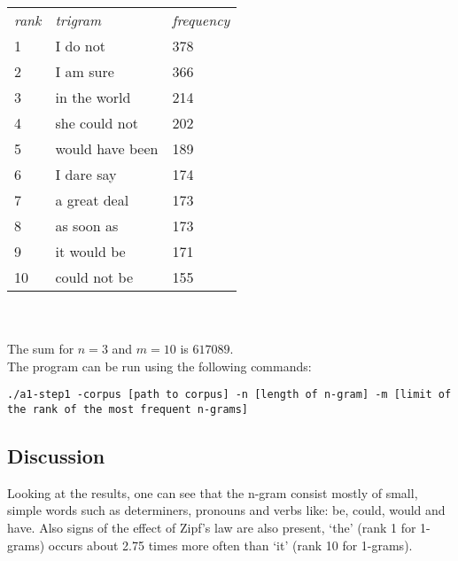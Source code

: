 \documentclass[a4paper, 10pt]{article}
\begin{document}
\begin{tabular}{l l l}
\textit{rank}&	\textit{trigram}	& \textit{frequency} \\
1	&	I do not		&	 378 \\
2	&	I am sure		&	 366 \\
3	&	in the world	&	 214 \\
4	&	she could not	&	 202 \\
5	&	would have been	&	 189 \\
6	&	I dare say		&	 174 \\
7	&	a great deal	&	 173 \\
8	&	as soon as		&	 173 \\
9	&	it would be		&	 171 \\
10	&	could not be	&	 155 \\
\end{tabular}\\
\\
The sum for $n = 3$ and $m = 10$ is $617089$.\\

The program can be run using the following commands:

\texttt{./a1-step1 -corpus [path to corpus] -n [length of n-gram] -m [limit of the rank of the most frequent n-grams]}

\subsection{Discussion}
Looking at the results, one can see that the n-gram consist mostly of small, simple words such as determiners, pronouns and verbs like: be, could, would and have. Also signs of the effect of Zipf’s law are also present, ‘the’ (rank 1 for 1-grams) occurs about 2.75 times more often than ‘it’ (rank 10 for 1-grams).
\end{document}
